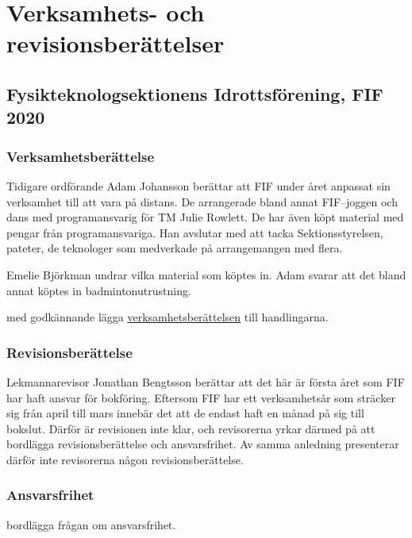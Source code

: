 \documentclass[hidelinks]{sektionsmote}
\begin{document}
\section{Verksamhets- och revisionsberättelser}

\subsection{Fysikteknologsektionens Idrottsförening, FIF 2020}

\subsubsection{Verksamhetsberättelse}
Tidigare ordförande Adam Johansson berättar att FIF under året anpassat sin verksamhet till att vara på distans.
De arrangerade bland annat FIF--joggen och dans med programansvarig för TM Julie Rowlett.
De har även köpt material med pengar från programansvariga.
Han avslutar med att tacka Sektionsstyrelsen, pateter, de teknologer som medverkade på arrangemangen med flera.

Emelie Björkman undrar vilka material som köptes in.
Adam svarar att det bland annat köptes in badmintonutrustning.

\begin{beslut}
  \item med godkännande lägga \hyperlink{bilagor/fifvb.pdf.1}{verksamhetsberättelsen} till handlingarna.
\end{beslut}

\subsubsection{Revisionsberättelse}
Lekmannarevisor Jonathan Bengtsson berättar att det här är första året som FIF har haft ansvar för bokföring. 
Eftersom FIF har ett verksamhetsår som sträcker sig från april till mars innebär det att de endast haft en månad på sig till bokslut.
Därför är revisionen inte klar, och revisorerna yrkar därmed på att bordlägga revisionsberättelse och ansvarsfrihet.
Av samma anledning presenterar därför inte revisorerna någon revisionsberättelse.

\subsubsection{Ansvarsfrihet}
\begin{beslut}
  \item bordlägga frågan om ansvarsfrihet.
\end{beslut}
\end{document}
